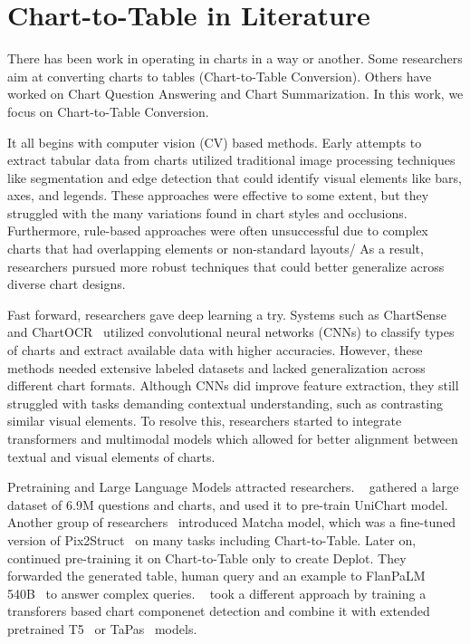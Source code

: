\documentclass[
	letterpaper, %
]{jdf}
\begin{document}
       \section{Chart-to-Table in Literature}\label{sect:literature}
       There has been work in operating in charts in a way or another.
       Some researchers aim at converting charts to tables (Chart-to-Table Conversion).
       Others have worked on Chart Question Answering and Chart Summarization.
       In this work, we focus on Chart-to-Table Conversion.

       It all begins with computer vision (CV) based methods. Early attempts to extract tabular data from charts utilized traditional image processing techniques like segmentation and edge detection that could identify visual elements like bars, axes, and legends. These approaches were effective to some extent, but they struggled with the many variations found in chart styles and occlusions. Furthermore, rule-based approaches were often unsuccessful due to complex charts that had overlapping elements or non-standard layouts/ As a result, researchers pursued more robust techniques that could better generalize across diverse chart designs. 

    Fast forward, researchers gave deep learning a try.
    Systems such as ChartSense~\cite{jung2017chartsense} and ChartOCR~\cite{luo2021chartocr} utilized convolutional neural networks (CNNs) to classify types of charts and extract available data with higher accuracies.
    However, these methods needed extensive labeled datasets and lacked generalization across different chart formats.
    Although CNNs did improve feature extraction, they still struggled with tasks demanding contextual understanding, such as contrasting similar visual elements.
    To resolve this, researchers started to integrate transformers and multimodal models which allowed for better alignment between textual and visual elements of charts.
    
Pretraining and Large Language Models attracted researchers.
~\cite{masry2023unichart} gathered a large dataset of 6.9M questions and charts, and used it to pre-train UniChart model.
Another group of researchers~\cite{liu2022matcha} introduced Matcha model, which was a fine-tuned version of Pix2Struct~\cite{lee2023pix2struct} on many tasks including Chart-to-Table.
Later on,~\cite{liu2022deplot} continued pre-training it on Chart-to-Table only to create Deplot.
They forwarded the generated table, human query and an example to FlanPaLM 540B~\cite{chung2024scaling} to answer complex queries.
~\cite{cheng2023chartreader} took a different approach by training a transforers based chart componenet detection and combine it with extended pretrained T5~\cite{raffel2020exploring} or TaPas~\cite{herzig2020tapas} models.
\end{document}
